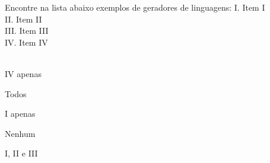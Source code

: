 \question[10]
Encontre na lista abaixo exemplos de geradores de linguagens:
I. Item I\\
II. Item II\\
III. Item III\\
IV. Item IV\\
\\
\begin{choices}
\item IV apenas
\item Todos
\item I apenas %
\item Nenhum
\item I, II e III
\end{choices}
\answerline
